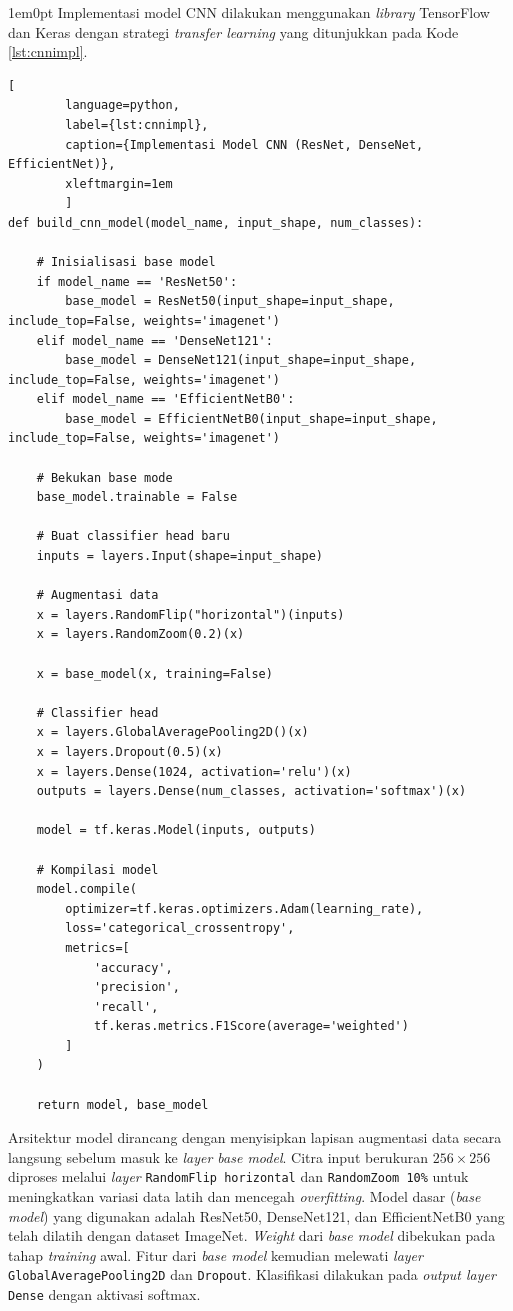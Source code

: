 \begin{adjustwidth}{1em}{0pt}
	\hspace{\parindent}Implementasi model CNN dilakukan menggunakan \textit{library} TensorFlow dan Keras dengan strategi \textit{transfer learning} yang ditunjukkan pada Kode \ref{lst:cnnimpl}.
	
	\begin{lstlisting}[
		language=python,
		label={lst:cnnimpl},
		caption={Implementasi Model CNN (ResNet, DenseNet, EfficientNet)},
		xleftmargin=1em
		]
def build_cnn_model(model_name, input_shape, num_classes):
	
	# Inisialisasi base model
	if model_name == 'ResNet50':
		base_model = ResNet50(input_shape=input_shape, include_top=False, weights='imagenet')
	elif model_name == 'DenseNet121':
		base_model = DenseNet121(input_shape=input_shape, include_top=False, weights='imagenet')
	elif model_name == 'EfficientNetB0':
		base_model = EfficientNetB0(input_shape=input_shape, include_top=False, weights='imagenet')
	
	# Bekukan base mode
	base_model.trainable = False
	
	# Buat classifier head baru
	inputs = layers.Input(shape=input_shape)
	
	# Augmentasi data
	x = layers.RandomFlip("horizontal")(inputs)
	x = layers.RandomZoom(0.2)(x)
	
	x = base_model(x, training=False)
	
	# Classifier head
	x = layers.GlobalAveragePooling2D()(x)
	x = layers.Dropout(0.5)(x)
	x = layers.Dense(1024, activation='relu')(x)
	outputs = layers.Dense(num_classes, activation='softmax')(x)
	
	model = tf.keras.Model(inputs, outputs)
	
	# Kompilasi model
	model.compile(
		optimizer=tf.keras.optimizers.Adam(learning_rate),
		loss='categorical_crossentropy',
		metrics=[
			'accuracy',
			'precision',
			'recall',
			tf.keras.metrics.F1Score(average='weighted')
		]
	)
	
	return model, base_model	
	\end{lstlisting}
	\begin{sloppypar}
		Arsitektur model dirancang dengan menyisipkan lapisan augmentasi data secara langsung sebelum masuk ke \textit{layer base model}. Citra input berukuran $256 \times 256$ diproses melalui \textit{layer} \texttt{RandomFlip horizontal} dan \texttt{RandomZoom 10\%} untuk meningkatkan variasi data latih dan mencegah \textit{overfitting}. Model dasar (\textit{base model}) yang digunakan adalah ResNet50, DenseNet121, dan EfficientNetB0 yang telah dilatih dengan dataset ImageNet. \textit{Weight} dari \textit{base model} dibekukan pada tahap \textit{training} awal. Fitur dari \textit{base model} kemudian melewati \textit{layer} \texttt{GlobalAveragePooling2D} dan \texttt{Dropout}. Klasifikasi dilakukan pada \textit{output layer} \texttt{Dense} dengan aktivasi softmax.
	\end{sloppypar}
\end{adjustwidth}

